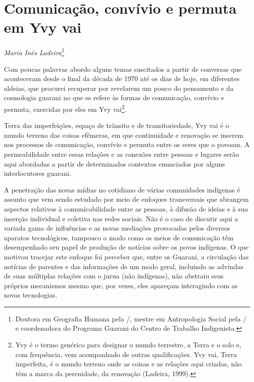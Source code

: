 \chapter{Comunicação, convívio e permuta em Yvy vai}
\begin{flushright}
\emph{Maria Inês Ladeira}\footnote{Doutora em Geografia Humana pela
/, mestre em Antropologia Social pela / e coordenadora do
Programa Guarani do Centro de Trabalho Indigenista.}
\end{flushright}

Com poucas palavras abordo alguns temas suscitados a partir de conversas
que aconteceram desde o final da década de 1970 até os dias de hoje, em
diferentes aldeias, que procurei recuperar por revelarem um pouco do
pensamento e da cosmologia guarani no que se refere às formas de
comunicação, convívio e permuta, exercidas por eles em Yvy
vai\footnote{Yvy é o termo genérico para designar o mundo terrestre, a
Terra e o solo e, com frequência, vem acompanhado de outras
qualificações. Yvy vai, Terra imperfeita, é o mundo terreno onde as
coisas e as relações aqui criadas, não têm a marca da perenidade, da
renovação (Ladeira, 1999).}.  

Terra das imperfeições, espaço de trânsito e de transitoriedade, Yvy vai
é o mundo terreno das coisas efêmeras, em que continuidade e renovação
se inserem nos processos de comunicação, convívio e permuta entre os
seres que o povoam. A permeabilidade entre essas relações e as conexões
entre pessoas e lugares serão aqui abordadas a partir de determinados
contextos enunciados por alguns interlocutores guarani. 

A penetração das novas mídias no cotidiano de várias comunidades
indígenas é assunto que vem sendo estudado por meio de enfoques
transversais que abrangem aspectos relativos à comunicabilidade entre
as pessoas, à difusão de ideias e à sua inserção individual e coletiva
nas redes sociais. Não é o caso de discutir aqui a variada gama de
influências e as novas mediações provocadas pelos diversos aparatos
tecnológicos, tampouco o modo como os meios de comunicação têm
desempenhado seu papel de produção de notícias sobre os povos
indígenas. O que motivou tracejar este enfoque foi perceber que, entre
os Guarani, a circulação das notícias de parentes e das informações de
um modo geral, incluindo as advindas de suas múltiplas relações com o
jurua (não indígenas), não abstraiu seus próprios mecanismos mesmo que,
por vezes, eles apareçam interagindo com as novas tecnologias.

